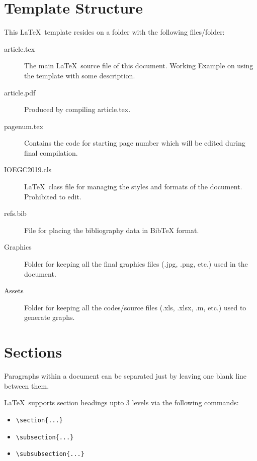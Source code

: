 \documentclass[fleqn, 11pt, twoside]{IOEGC2019}
\begin{document}
\section{Template Structure} \label{sec:struct}
This \LaTeX\ template resides on a folder with the following files/folder:
\begin{description}
	\item[article.tex]		The main \LaTeX\ source file of this document. 
		Working Example on using the template with some description.
	\item[article.pdf]		Produced by compiling article.tex.
	\item[pagenum.tex]		Contains the code for starting page number which 
							will be edited during final compilation.
	\item[IOEGC2019.cls] 	\LaTeX\ class file for managing the styles and 
		formats of the document. Prohibited to edit.
	\item[refs.bib] 	File for placing the bibliography data in BibTeX format.
	\item[Graphics] 		Folder for keeping all the final graphics files 
							(.jpg, .png, etc.) used in the document. 
	\item[Assets]   		Folder for keeping all the codes/source files 
							(.xls, .xlsx, .m, etc.) used to generate graphs. 
\end{description}


\section{Sections}
Paragraphs within a document can be separated just by leaving one blank line 
between them.

\LaTeX\ supports section headings upto 3 levels via the following commands:

\begin{itemize}[noitemsep]
	\item \verb+\section{...}+
	\item \verb+\subsection{...}+
	\item \verb+\subsubsection{...}+
\end{itemize} 
\end{document}
